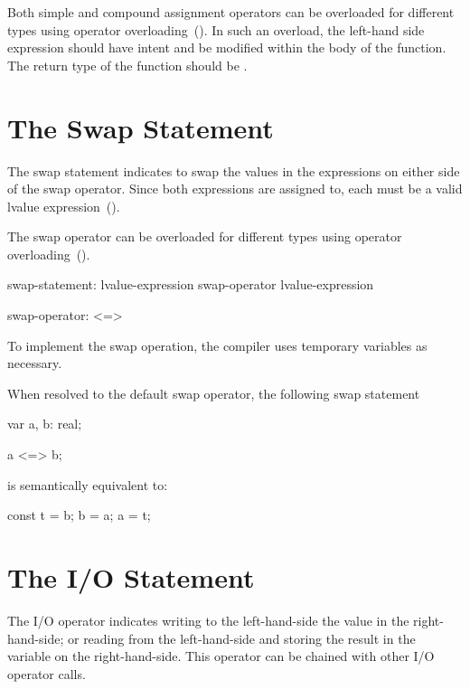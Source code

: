 Both simple and compound assignment operators can be overloaded for different
types using operator overloading~().
In such an overload, the left-hand side expression should have
 intent and be modified within the body of the function.  The return
type of the function should be .

\section{The Swap Statement}
\label{The_Swap_Statement}

The swap statement indicates to swap the values in the expressions
on either side of the swap operator.  Since both expressions are assigned
to, each must be a valid lvalue expression~().

The swap operator can be overloaded for different types using operator
overloading~().
\begin{syntax}
swap-statement:
  lvalue-expression swap-operator lvalue-expression

swap-operator:
  <=>
\end{syntax}

To implement the swap operation, the compiler uses temporary variables
as necessary.

\begin{example}
When resolved to the default swap operator, the following swap statement
\begin{chapel}
var a, b: real;

a <=> b;
\end{chapel}
is semantically equivalent to:
\begin{chapel}
const t = b;
b = a;
a = t;
\end{chapel}
\end{example}

\section{The I/O Statement}
\label{The_IO_Statement}

The I/O operator indicates writing to the left-hand-side the value in the
right-hand-side; or reading from the left-hand-side and storing the result
in the variable on the right-hand-side. This operator can be chained with
other I/O operator calls.

